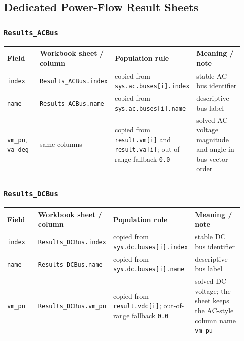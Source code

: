 \subsection{Dedicated Power-Flow Result Sheets}

\footnotesize

\subsubsection*{\texttt{Results\_ACBus}}

\begin{longtable}{@{}L{0.18\linewidth}L{0.26\linewidth}L{0.22\linewidth}L{0.28\linewidth}@{}}
\toprule
Field & Workbook sheet / column & Population rule & Meaning / note \\
\midrule
\endhead
\texttt{index} & \texttt{Results\_ACBus.index} & copied from \texttt{sys.ac.buses[i].index} & stable AC bus identifier \\
\texttt{name} & \texttt{Results\_ACBus.name} & copied from \texttt{sys.ac.buses[i].name} & descriptive bus label \\
\texttt{vm\_pu}, \texttt{va\_deg} & same columns & copied from \texttt{result.vm[i]} and \texttt{result.va[i]}; out-of-range fallback \texttt{0.0} & solved AC voltage magnitude and angle in bus-vector order \\
\bottomrule
\end{longtable}

\subsubsection*{\texttt{Results\_DCBus}}

\begin{longtable}{@{}L{0.18\linewidth}L{0.26\linewidth}L{0.22\linewidth}L{0.28\linewidth}@{}}
\toprule
Field & Workbook sheet / column & Population rule & Meaning / note \\
\midrule
\endhead
\texttt{index} & \texttt{Results\_DCBus.index} & copied from \texttt{sys.dc.buses[i].index} & stable DC bus identifier \\
\texttt{name} & \texttt{Results\_DCBus.name} & copied from \texttt{sys.dc.buses[i].name} & descriptive bus label \\
\texttt{vm\_pu} & \texttt{Results\_DCBus.vm\_pu} & copied from \texttt{result.vdc[i]}; out-of-range fallback \texttt{0.0} & solved DC voltage; the sheet keeps the AC-style column name \texttt{vm\_pu} \\
\bottomrule
\end{longtable}

